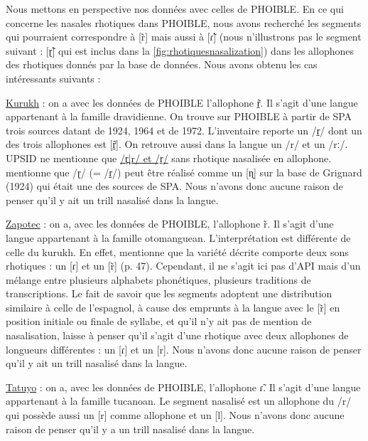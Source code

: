 Nous mettons en perspective nos données avec celles de PHOIBLE. En ce qui concerne les nasales rhotiques dans PHOIBLE, nous avons recherché les segments qui pourraient correspondre à [r̃]  mais aussi à [ɾ̃] (nous n'illustrons pas le segment suivant : [ɽ̃] qui est inclus dans la \autoref{fig:rhotiquesnasalization}) dans les allophones des rhotiques donnés par la base de données. Nous avons obtenu les cas intéressants suivants :

\begin{exe}
	\ex \begin{xlist}

	\ex \href{https://phoible.org/inventories/view/7}{Kurukh}  : on a avec les données de PHOIBLE l'allophone r̠̃. Il s'agit d'une langue appartenant à la famille dravidienne. On trouve sur PHOIBLE à partir de SPA trois sources datant de 1924, 1964 et de 1972. L'inventaire reporte un /r̠/ dont un des trois allophones est [r̠̃]. On retrouve aussi dans la langue un /r/ et un /rː/. UPSID ne mentionne que \href{https://phoible.org/inventories/view/429}{/r̪|r/ et /r̠/} sans rhotique nasalisée en allophone. \textcite[36]{kobayashiKuruxLanguageGrammar2017} mentionne que /ɽ/ (= /r̠/) peut être réalisé comme un [ɳ] sur la base de Grignard (1924) qui était une des sources de SPA. Nous n'avons donc aucune raison de penser qu'il y ait un trill nasalisé dans la langue.
	
	\ex \href{https://phoible.org/inventories/view/1022}{Zapotec}  : on a, avec les données de PHOIBLE, l'allophone r̃. Il s'agit d'une langue appartenant à la famille otomanguean. L'interprétation est différente de celle du kurukh. En effet, \textcite{beamdeazconaCoatlanLoxichaZapotecGrammar2004} mentionne que la variété décrite comporte deux sons rhotiques : un [ɾ] et un [r̃] (p. 47). Cependant, il ne s'agit ici pas d'API mais d'un mélange entre plusieurs alphabets phonétiques, plusieurs traditions de transcriptions. Le fait de savoir que les segments adoptent une distribution similaire à celle de l'espagnol, à cause des emprunts à la langue avec le [r̃] en position initiale ou finale de syllabe, et qu'il n'y ait pas de mention de nasalisation, laisse à penser qu'il s'agit d'une rhotique avec deux allophones de longueurs différentes : un [ɾ] et un [r]. Nous n'avons donc aucune raison de penser qu'il y ait un trill nasalisé dans la langue.
	
	\ex \href{https://phoible.org/inventories/view/1040}{Tatuyo}  : on a, avec les données de PHOIBLE, l'allophone ɾ̃. Il s'agit d'une langue appartenant à la famille tucanoan. Le segment nasalisé est un allophone du /r/ qui possède aussi un [r] comme allophone et un [l]. Nous n'avons donc aucune raison de penser qu'il y a un trill nasalisé dans la langue.
	

\end{xlist}
\end{exe}
